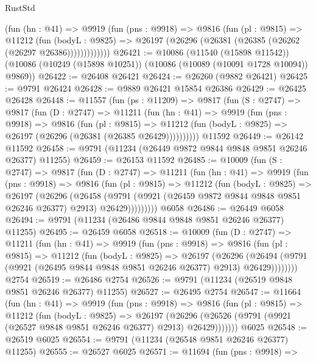 \begin{lexlean}{RustStd}
\begin{coremodule}
            (fun (hn : @41) =>
            @9919
              (fun (pns : @9918) =>
              @9816
                (fun (pl : @9815) =>
                @11212
                  (fun (bodyL : @9825) =>
                  @26197 (@26296 (@26381 (@26385 (@26262 (@26297 @26386)))))))))))))
@26421 := @10086
    (@11540 (@15898 @11542))
    (@10086 (@10249 (@15898 @10251)) (@10086 (@10089 (@10091 @1728 @10094)) @9869))
@26422 := @26408 @26421
@26424 := @26260 (@9882 @26421)
@26425 := @9791 @26424
@26428 := @9889 @26421 @15854 @26386
@26429 := @26425 @26428
@26448 := @11557
    (fun (ps : @11209) =>
    @9817
      (fun (S : @2747) =>
      @9817
        (fun (D : @2747) =>
        @11211
          (fun (hn : @41) =>
          @9919
            (fun (pns : @9918) =>
            @9816
              (fun (pl : @9815) =>
              @11212 (fun (bodyL : @9825) => @26197 (@26296 (@26381 (@26385 @26429))))))))))
    @11592
@26449 := @26142 @11592
@26458 := @9791 (@11234 (@26449 @9872 @9844 @9848 @9851 @26246 @26377) @11255)
@26459 := @26153 @11592
@26485 := @10009
    (fun (S : @2747) =>
    @9817
      (fun (D : @2747) =>
      @11211
        (fun (hn : @41) =>
        @9919
          (fun (pns : @9918) =>
          @9816
            (fun (pl : @9815) =>
            @11212
              (fun (bodyL : @9825) =>
              @26197
                (@26296
                  (@26458
                    (@9791
                      (@9921 (@26459 @9872 @9844 @9848 @9851 @26246 @26377) @2913)
                      @26429)))))))))
    @6058
@26486 := @26449 @6058
@26494 := @9791 (@11234 (@26486 @9844 @9848 @9851 @26246 @26377) @11255)
@26495 := @26459 @6058
@26518 := @10009
    (fun (D : @2747) =>
    @11211
      (fun (hn : @41) =>
      @9919
        (fun (pns : @9918) =>
        @9816
          (fun (pl : @9815) =>
          @11212
            (fun (bodyL : @9825) =>
            @26197
              (@26296
                (@26494 (@9791 (@9921 (@26495 @9844 @9848 @9851 @26246 @26377) @2913) @26429))))))))
    @2754
@26519 := @26486 @2754
@26526 := @9791 (@11234 (@26519 @9848 @9851 @26246 @26377) @11255)
@26527 := @26495 @2754
@26547 := @11664
    (fun (hn : @41) =>
    @9919
      (fun (pns : @9918) =>
      @9816
        (fun (pl : @9815) =>
        @11212
          (fun (bodyL : @9825) =>
          @26197
            (@26296 (@26526 (@9791 (@9921 (@26527 @9848 @9851 @26246 @26377) @2913) @26429)))))))
    @6025
@26548 := @26519 @6025
@26554 := @9791 (@11234 (@26548 @9851 @26246 @26377) @11255)
@26555 := @26527 @6025
@26571 := @11694
    (fun (pns : @9918) =>

\end{coremodule}
\end{lexlean}
